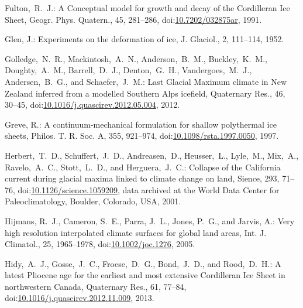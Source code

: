 \documentclass[tc, manuscript]{copernicus}
\begin{document}
\begin{thebibliography}{114}
Fulton,~R.~J.: A Conceptual model for growth and decay of the Cordilleran Ice Sheet, G{e}ogr. Phys. Quatern., 45, 281--286,
doi:\href{http://dx.doi.org/10.7202/032875ar}{10.7202/032875ar}, 1991.


Glen, J.: Experiments on the deformation of ice, J. Glaciol., 2, 111--114, 1952.


Golledge,~N.~R., Mackintosh,~A.~N., Anderson,~B.~M., Buckley,~K.~M., Doughty,~A.~M., Barrell,~D.~J., Denton,~G.~H., Vandergoes,~M.~J., Andersen,~B.~G., and Schaefer,~J.~M.: Last Glacial Maximum climate in {N}ew {Z}ealand inferred from a modelled {S}outhern {A}lps icefield, Quaternary Res., 46, 30--45,
doi:\href{http://dx.doi.org/10.1016/j.quascirev.2012.05.004}{10.1016/j.quascirev.2012.05.004}, 2012.


Greve, R.: A continuum-mechanical formulation for shallow polythermal ice sheets, Philos. T. R. Soc. A, 355, 921--974,
doi:\href{http://dx.doi.org/10.1098/rsta.1997.0050}{10.1098/rsta.1997.0050}, 1997.


Herbert,~T.~D., Schuffert,~J.~D., Andreasen,~D., Heusser,~L., Lyle,~M., Mix,~A., Ravelo,~A.~C., Stott,~L.~D., and Herguera,~J.~C.: Collapse of the California current during glacial maxima linked to climate change on land, Sience, 293, 71--76,
doi:\href{http://dx.doi.org/10.1126/science.1059209}{10.1126/science.1059209}, data archived at the World Data Center for Paleoclimatology, Boulder, Colorado, USA, 2001.


Hijmans, R.~J., Cameron, S.~E., Parra, J.~L., Jones, P.~G., and Jarvis, A.: Very high resolution interpolated climate surfaces for global land areas, Int. J. Climatol., 25, 1965--1978,
doi:\href{http://dx.doi.org/10.1002/joc.1276}{10.1002/joc.1276}, 2005.


Hidy,~A.~J., Gosse,~J.~C., Froese,~D.~G., Bond,~J.~D., and Rood,~D.~H.: A latest Pliocene age for the earliest and most extensive Cordilleran Ice Sheet in northwestern Canada, Quaternary Res., 61, 77--84,
doi:\href{http://dx.doi.org/10.1016/j.quascirev.2012.11.009}{10.1016/j.quascirev.2012.11.009}, 2013.



\end{thebibliography}
\end{document}
